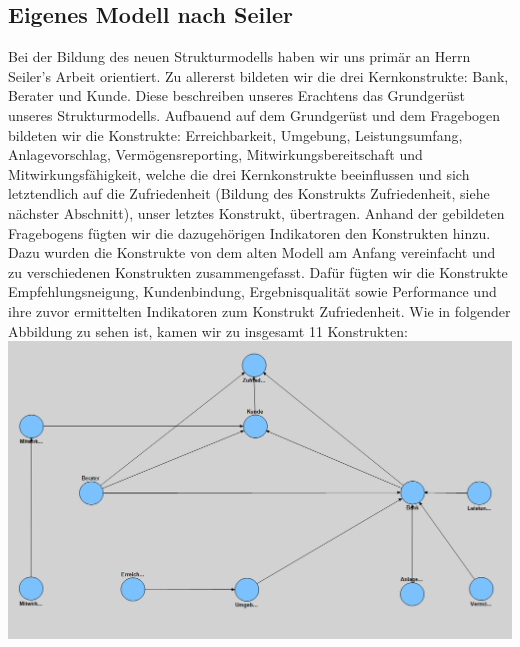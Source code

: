 \documentclass{article}\usepackage[]{graphicx}\usepackage[]{color}
\begin{document}
\subsection{Eigenes Modell nach Seiler}
Bei der Bildung des neuen Strukturmodells haben wir uns primär an Herrn Seiler's Arbeit orientiert. Zu allererst bildeten wir die drei Kernkonstrukte: Bank, Berater und Kunde. Diese beschreiben unseres Erachtens das Grundgerüst unseres Strukturmodells. Aufbauend auf dem Grundgerüst und dem Fragebogen bildeten wir die Konstrukte: Erreichbarkeit, Umgebung, Leistungsumfang, Anlagevorschlag, Vermögensreporting, Mitwirkungsbereitschaft und Mitwirkungsfähigkeit, welche die drei Kernkonstrukte beeinflussen und sich letztendlich auf die Zufriedenheit (Bildung des Konstrukts Zufriedenheit, siehe nächster Abschnitt), unser letztes Konstrukt, übertragen. Anhand der gebildeten Fragebogens fügten wir die dazugehörigen Indikatoren den Konstrukten hinzu.
Dazu wurden die Konstrukte von dem alten Modell am Anfang vereinfacht und zu verschiedenen Konstrukten zusammengefasst. Dafür fügten wir die Konstrukte Empfehlungsneigung, Kundenbindung, Ergebnisqualität sowie Performance und ihre zuvor ermittelten Indikatoren zum Konstrukt Zufriedenheit. Wie in folgender Abbildung zu sehen ist, kamen wir zu insgesamt 11 Konstrukten:\\


\hspace*{-4.8cm}\includegraphics[scale = 0.83]{figure/finalesmodell}
\end{document}
